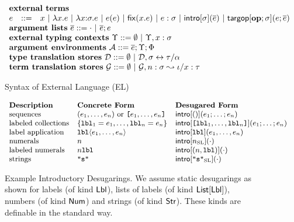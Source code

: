 \begin{figure}[p]
\small
$\begin{array}{lcl}%
\multicolumn{3}{l}{\textbf{external terms}}\\
e & ::= & \multicolumn{1}{l}{x ~|~ \eanalam{x}{e} ~|~ \elam{\st}{x}{e} ~|~ \eap{e}{e} ~|~ \efix{x}{e} ~|~ \easc{e}{\st} ~|~ \eintro{\st}{\es} ~|~ \etarg{\opname{op}}{\st}{e}{\es}}\\
\multicolumn{3}{l}{\textbf{argument lists}~\es ::= \cdot ~|~ \es; e}\\
\multicolumn{3}{l}{\textbf{external typing contexts}~\Upsilon ::=  \emptyset ~|~ \Upsilon, x : \st}\\
\multicolumn{3}{l}{\textbf{argument environments}~\argEnv ::= \es; \Upsilon; \Phi}\\
\multicolumn{3}{l}{\textbf{type translation stores}~\memD ::= \emptyset ~|~ \memD, \st \leftrightarrow \tau/\alpha}\\
\multicolumn{3}{l}{\textbf{term translation stores}~\memG ::= \emptyset ~|~ \memG, n : \st \leadsto \iota / x : \tau}\\
\end{array}%
$
\caption[Syntax of External Language (EL)]{Syntax of  External Language (EL)}
\label{syntax-EL}
\end{figure}


\begin{figure}
$\small
\begin{array}{lll}
\textbf{Description} ~~~~& \textbf{Concrete Form}~~~~ & \textbf{Desugared Form}\\
\text{sequences} & (e_1, \ldots, e_n) ~\text{or}~ \texttt{[}e_1, \ldots, e_n\texttt{]} & {\sf intro}[()](e_1; \ldots; e_n)\\
\text{labeled collections} & \{\mathtt{lbl}_1=e_1, \ldots, \mathtt{lbl}_n=e_n\} & {\sf intro}[\texttt{[}\mathtt{lbl}_1, \ldots, \mathtt{lbl}_n\texttt{]}](e_1; \ldots; e_n)\\
\text{label application} & \mathtt{lbl}\langle e_1, \ldots, e_n \rangle & {\sf intro}[\mathtt{lbl}](e_1, \ldots, e_n)\\
\text{numerals} & n & {\sf intro}[n_\text{SL}](\cdot)\\
\text{labeled numerals} & n\texttt{lbl} & {\sf intro}[(n, \texttt{lbl})](\cdot)\\
\text{strings} & \texttt{"s"} & {\sf intro}[\texttt{"s"}_\text{SL}](\cdot)
\end{array}
$
\caption[Example Introductory Desugarings]{Example Introductory Desugarings. We assume static desugarings as shown for labels (of kind ${\sf Lbl}$), lists of labels (of kind ${\sf List}[{\sf Lbl}]$), numbers (of kind ${\sf Num}$) and strings (of kind ${\sf Str}$). These kinds are definable in the standard way.}
\label{fig:example-intro-desugarings}
\end{figure}

